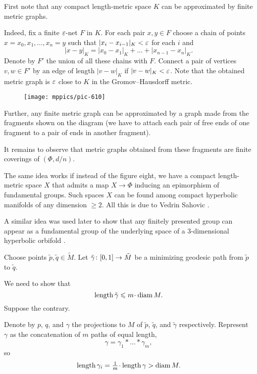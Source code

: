 First note that any compact length-metric space $K$ can be approximated by finite metric graphs.

Indeed, fix a finite $\varepsilon$-net $F$ in $K$.
For each pair $x,y\in F$ choose a chain of points $x=x_0,x_1,\dots, x_n=y$ such that
$|x_i-x_{i-1}|_K<\varepsilon$ for each $i$ and 
\[|x-y|_K=|x_0-x_1|_K+\dots+|x_{n-1}-x_n|_K.\]
Denote by $F'$ the union of all these chains with $F$.
Connect a pair of vertices $v,w\in F'$ by an edge of length $|v-w|_K$ if $|v-w|_K<\varepsilon$.
Note that the obtained metric graph is $\varepsilon$ close to $K$ in the Gromov--Hausdorff metric.

\begin{wrapfigure}{o}{25 mm}
\vskip-3mm
\centering
\texttt{[image: mppics/pic-610]}
\vskip-3mm
\end{wrapfigure}

Further, any finite metric graph can be approximated by a graph made from the fragments shown on the diagram
(we have to attach each pair of free ends of one fragment to a pair of ends in another fragment).

It remains to observe that metric graphs obtained from these fragments are finite coverings of $(\Phi,d/n)$.
\qeds


The same idea works if instead of the figure eight, we have a compact length-metric space $X$ that admits a map $X\to\Phi$ inducing an epimorphism of fundamental groups.
Such spaces $X$ can be found among compact hyperbolic manifolds of any dimension $\ge 2$.
All this is due to Vedrin Sahovic \cite{sahovic}.

A similar idea was used later to show that any finitely presented group can appear as a fundamental group of the underlying space of a 3-dimensional hyperbolic orbifold \cite{panov-petrunin-telescopic}.





Choose points $\tilde p,\tilde q\in\tilde M$.
Let  
$\tilde\gamma\:[0,1]\z\to \tilde M$ be a minimizing geodesic path from $\tilde p$ to $\tilde q$. 

We need to show that 
\[\length \tilde\gamma\le m\cdot \diam M.\]
Suppose the contrary.

Denote by $p$, $q$, and $\gamma$ the projections to $M$ of $\tilde p$, $\tilde q$, and $\tilde \gamma$ respectively. 
Represent $\gamma$
as the concatenation of $m$ paths of equal length,
\[\gamma=\gamma_1{*}\dots{*}\gamma_m,\] 
so
\[\length\gamma_i=\tfrac{1}m\cdot\length\gamma>\diam M.\] 

